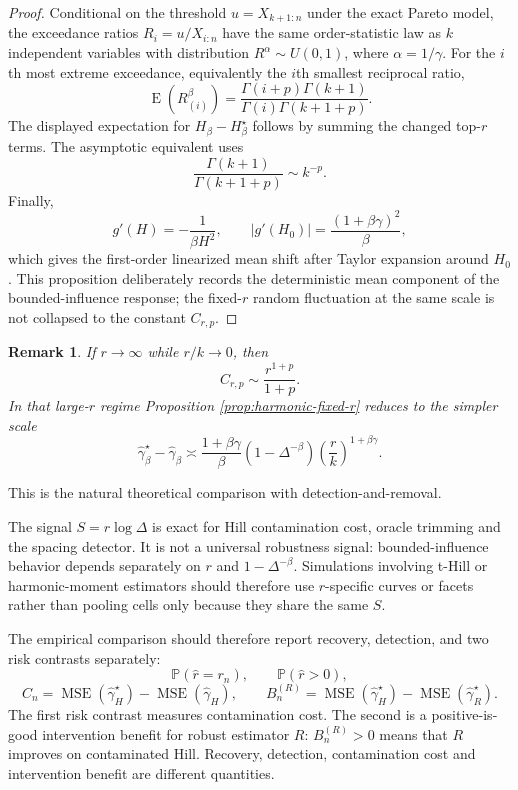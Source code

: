 \documentclass[11pt]{article}
\newtheorem{remark}{Remark}
\DeclareMathOperator{\E}{E}
\newcommand{\Pp}{\mathbb{P}}
\newcommand{\ghat}{\widehat{\gamma}}
\begin{document}
\begin{proof}
Conditional on the threshold $u=X_{k+1:n}$ under the exact Pareto model, the
exceedance ratios $R_i=u/X_{i:n}$ have the same order-statistic law as $k$
independent variables with distribution $R^\alpha\sim U(0,1)$, where
$\alpha=1/\gamma$.  For the $i$th most extreme exceedance, equivalently the
$i$th smallest reciprocal ratio,
\[
  \E(R_{(i)}^\beta)
  =
  \frac{\Gamma(i+p)\Gamma(k+1)}
       {\Gamma(i)\Gamma(k+1+p)}.
\]
The displayed expectation for $H_\beta-H_\beta^\star$ follows by summing the
changed top-$r$ terms.  The asymptotic equivalent uses
\[
  \frac{\Gamma(k+1)}{\Gamma(k+1+p)}\sim k^{-p}.
\]
Finally,
\[
  g'(H)=-\frac{1}{\beta H^2},
  \qquad
  |g'(H_0)|=\frac{(1+\beta\gamma)^2}{\beta},
\]
which gives the first-order linearized mean shift after Taylor expansion around
$H_0$.  This proposition deliberately records the deterministic mean component
of the bounded-influence response; the fixed-$r$ random fluctuation at the same
scale is not collapsed to the constant $C_{r,p}$.
\end{proof}

\begin{remark}
If $r\to\infty$ while $r/k\to0$, then
\[
  C_{r,p}\sim\frac{r^{1+p}}{1+p}.
\]
In that large-$r$ regime Proposition \ref{prop:harmonic-fixed-r} reduces to
the simpler scale
\[
  \widehat\gamma_\beta^\star-\widehat\gamma_\beta
  \asymp
  \frac{1+\beta\gamma}{\beta}
  (1-\Delta^{-\beta})
  \left(\frac rk\right)^{1+\beta\gamma}.
\]
\end{remark}
This is the natural theoretical comparison with detection-and-removal.

The signal $S=r\log\Delta$ is exact for Hill contamination cost, oracle
trimming and the spacing detector.  It is not a universal robustness signal:
bounded-influence behavior depends separately on $r$ and
$1-\Delta^{-\beta}$.  Simulations involving t-Hill or harmonic-moment
estimators should therefore use $r$-specific curves or facets rather than
pooling cells only because they share the same $S$.

The empirical comparison should therefore report recovery, detection, and two
risk contrasts separately:
\[
  \Pp(\widehat r=r_n),
  \qquad
  \Pp(\widehat r>0),
\]
\[
  C_n
  =
  \operatorname{MSE}(\ghat_H^\star)
  -
  \operatorname{MSE}(\ghat_H),
  \qquad
  B_n^{(R)}
  =
  \operatorname{MSE}(\ghat_H^\star)
  -
  \operatorname{MSE}(\widehat\gamma_R^\star).
\]
The first risk contrast measures contamination cost.  The second is a
positive-is-good intervention benefit for robust estimator $R$: $B_n^{(R)}>0$
means that $R$ improves on contaminated Hill.  Recovery, detection,
contamination cost and intervention benefit are different quantities.
\end{document}

